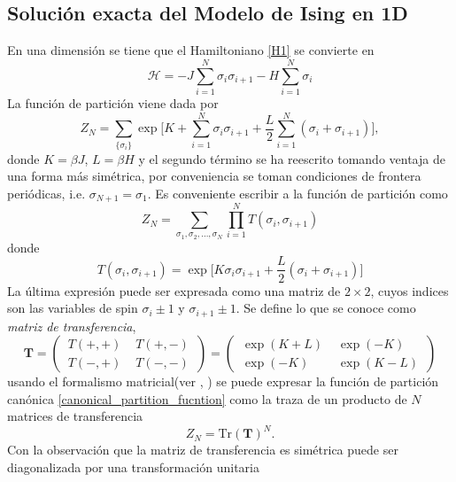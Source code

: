 \documentclass[a4paper]{article}
\begin{document}
\subsection{Solución exacta del Modelo de Ising en 1D}
En una dimensión se tiene que el Hamiltoniano \ref{H1} se convierte en 
\begin{equation}
\mathcal{H}=-J\sum_{i=1}^{N}\sigma_i\sigma_{i+1}-H\sum_{i=1}^{N}\sigma_i
\end{equation}
La función de partición viene dada por 
\begin{equation}
Z_N=\sum_{\{\sigma_i \}}\exp\Bigg[ K+\sum_{i=1}^{N}\sigma_i\sigma_{i+1}+\frac{L}{2}\sum_{i=1}^{N}(\sigma_i+\sigma_{i+1}) \Bigg],
\end{equation}
donde $K=\beta J$, $L=\beta H$ y el segundo término se ha reescrito tomando ventaja de una forma más simétrica, por conveniencia se toman condiciones de frontera periódicas, i.e. $\sigma_{N+1}=\sigma_1$. Es conveniente escribir a la función de partición como 
\begin{equation}\label{canonical_partition_fucntion}
Z_N=\sum_{\sigma_1,\sigma_2,\hdots,\sigma_N}\prod^N_{i=1}T(\sigma_i, \sigma_{i+1})
\end{equation}
donde
\begin{equation}
T(\sigma_i,\sigma_{i+1})=\exp \Big[  K\sigma_i\sigma_{i+1}+\frac{L}{2}(\sigma_i+\sigma_{i+1}) \Big]
\end{equation}
La última expresión puede ser expresada como una matriz de $2\times 2$, cuyos indices son las variables de spin $\sigma_i\pm 1$ y $\sigma_{i+1}\pm 1$. Se define lo que se conoce como \textit{matriz de transferencia},
\begin{equation}
\mathbf{T}=
\begin{pmatrix}
\,T(+,+)\, &\, T(+,-)\,\\
\,T(-,+)\, &\, T(-,-)\,
\end{pmatrix}=
\begin{pmatrix}
\,\exp(K+L)\, &\,\exp(-K)\,\\
\,\exp(-K)\, &\, \exp(K-L)\,
\end{pmatrix}
\end{equation}
usando el formalismo matricial(ver \cite{Silvio}, \cite{Pathria}) se puede expresar la función de partición canónica \ref{canonical_partition_fucntion} como la traza de un producto de $N$ matrices de transferencia
\begin{equation}
Z_N=\text{Tr}(\mathbf{T})^N.
\end{equation}
Con la observación que la matriz de transferencia es simétrica puede ser diagonalizada por una transformación unitaria
\end{document}
